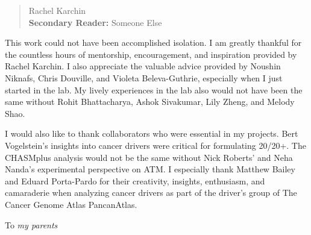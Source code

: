 \begin{frontmatter}
\begin{abstract}
\vfill
{} Rachel Karchin \\
{\bf{Secondary Reader:}} Someone Else
\end{abstract}

\begin{acknowledgment}

This work could not have been accomplished isolation. I am greatly thankful for the countless hours of mentorship, encouragement, and inspiration provided by Rachel Karchin. I also appreciate the valuable advice provided by Noushin Niknafs, Chris Douville, and Violeta Beleva-Guthrie, especially when I just started in the lab. My lively experiences in the lab also would not have been the same without Rohit Bhattacharya, Ashok Sivakumar, Lily Zheng, and Melody Shao.

I would also like to thank collaborators who were essential in my projects. Bert Vogelstein's insights into cancer drivers were critical for formulating 20/20+. The CHASMplus analysis would not be the same without Nick Roberts' and Neha Nanda's experimental perspective on ATM. I especially thank Matthew Bailey and Eduard Porta-Pardo for their creativity, insights, enthusiasm, and camaraderie when analyzing cancer drivers as part of the driver's group of The Cancer Genome Atlas PancanAtlas.

\end{acknowledgment}

\begin{dedication}
 
To \textit{my parents}

\end{dedication}

\tableofcontents

\listoftables

\listoffigures

\end{frontmatter}
